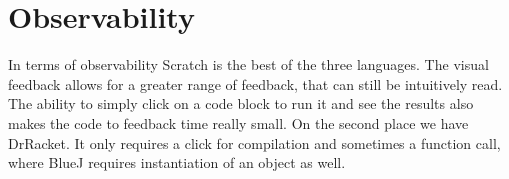 \section{Observability}
\label{sec:observability}
In terms of observability Scratch is the best of the three languages.
The visual feedback allows for a greater range of feedback, that can still be intuitively read.
The ability to simply click on a code block to run it and see the results also makes the code to feedback time really small.
On the second place we have DrRacket.
It only requires a click for compilation and sometimes a function call, where BlueJ requires instantiation of an object as well.
 